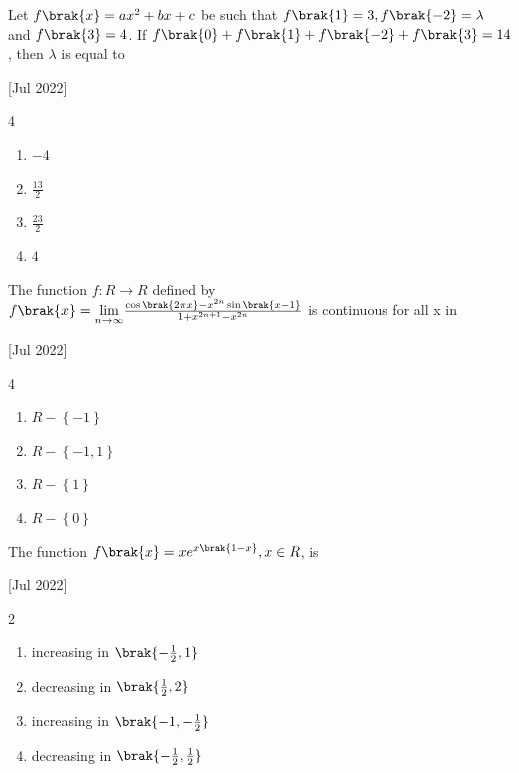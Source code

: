     \item Let $f\brak{x}=ax^2+bx+c$ be such that $f\brak{1}=3,f\brak{-2}=\lambda$ and $f\brak{3}=4$. If $f\brak{0}+f\brak{1}+f\brak{-2}+f\brak{3}=14$, then $\lambda$ is equal to 
    
    \hfill{[Jul 2022]}

		\begin{multicols}{4}
			\begin{enumerate}
				\item $-4$
				\item $\frac{13}{2}$
				\item $\frac{23}{2}$
				\item $4$
			\end{enumerate}
		\end{multicols}

    \item The function $f:R\to R$ defined by $f\brak{x}=\underset{n\to\infty}{\lim}\frac{\cos\brak{2\pi x}-x^{2n}\sin\brak{x-1}}{1+x^{2n+1}-x^{2n}}$ is continuous for all x in
    
    \hfill{[Jul 2022]}

		\begin{multicols}{4}
			\begin{enumerate}
				\item $R-\left\{-1\right\}$
				\item $R-\left\{-1,1\right\}$
				\item $R-\left\{1\right\}$
				\item $R-\left\{0\right\}$
			\end{enumerate}
		\end{multicols}
  
    \item The function $f\brak{x}=xe^{x\brak{1-x}},x\in R$, is
    
    \hfill{[Jul 2022]}

        \begin{multicols}{2}
            \begin{enumerate}
                \item increasing in $\brak{-\frac{1}{2},1}$
                \item decreasing in $\brak{\frac{1}{2},2}$
                \item increasing in $\brak{-1,-\frac{1}{2}}$
                \item decreasing in $\brak{-\frac{1}{2},\frac{1}{2}}$
            \end{enumerate}
        \end{multicols}

